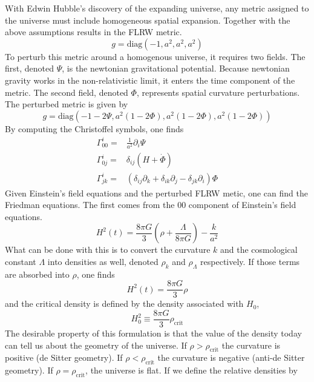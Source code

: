 With Edwin Hubble's discovery of the expanding universe, any metric assigned to the universe must include homogeneous spatial expansion. Together with the above assumptions results in the FLRW metric.
\begin{equation}
    g = \mathrm{diag}(-1,a^2,a^2,a^2)
\end{equation}
To perturb this metric around a homogenous universe, it requires two fields. The first, denoted $\Psi$, is the newtonian gravitational potential. Because newtonian gravity works in the non-relativistic limit, it enters the time component of the metric. The second field, denoted $\Phi$, represents spatial curvature perturbations. The perturbed metric is given by
\begin{equation}
    g = \mathrm{diag}(-1-2\Psi,a^2(1-2\Phi),a^2(1-2\Phi),a^2(1-2\Phi))
\end{equation}
By computing the Christoffel symbols, one finds
\begin{equation}
    \begin{split}
        \Gamma^i_{00} =& \frac{1}{a^2}\partial_i\Psi \\
        \Gamma^i_{0j} =& \delta_{ij}(H+\dot\Phi) \\
        \Gamma^i_{jk} =& (\delta_{ij} \partial_k + \delta_{ik}\partial_j - \delta_{jk}\partial_i)\Phi
    \end{split}
\end{equation}
Given Einstein's field equations and the perturbed FLRW metic, one can find the Friedman equations. The first comes from the 00 component of Einstein's field equations.
\begin{equation}
    H^2(t) = \frac{8\pi G}{3}\left(\rho + \frac{\Lambda}{8\pi G}\right) - \frac{k}{a^2}
\end{equation}
What can be done with this is to convert the curvature $k$ and the cosmological constant $\Lambda$ into densities as well, denoted $\rho_k$ and $\rho_\Lambda$ respectively. If those terms are absorbed into $\rho$, one finds
\begin{equation}
    H^2(t) = \frac{8\pi G}{3}\rho
\end{equation}
and the critical density is defined by the density associated with $H_0$,
\begin{equation}
    H_0^2 \equiv \frac{8\pi G}{3}\rho_{\mathrm{crit}}
\end{equation}
The desirable property of this formulation is that the value of the density today can tell us about the geometry of the universe. If $\rho>\rho_{\mathrm{crit}}$ the curvature is positive (de Sitter geometry). If $\rho<\rho_{\mathrm{crit}}$ the curvature is negative (anti-de Sitter geometry). If $\rho=\rho_{\mathrm{crit}}$, the universe is flat. If we define the relative densities by
